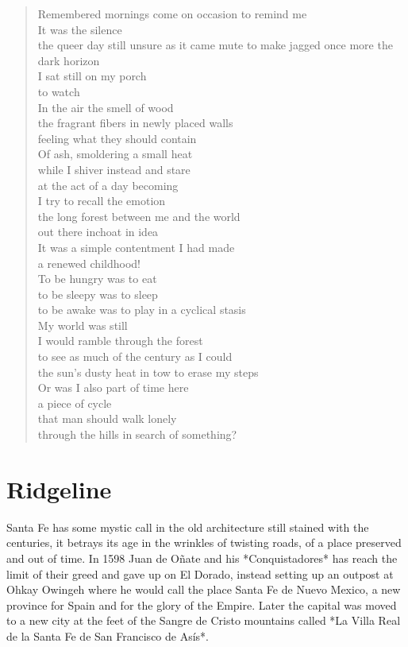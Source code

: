\documentclass[ebook, 10pt, openright, onecolumn]{memoir}
\newenvironment{poetry}
{
  \begin{quote}
    \begin{itshape}
      \small
    }
    {
    \end{itshape}
  \end{quote}
}
\begin{document}
\begin{poetry}
  Remembered mornings come on occasion to remind me\\
  It was the silence\\
  the queer day still unsure as it came mute to make jagged
  once more the dark horizon\\
  I sat still on my porch\\
  to watch\\
  In the air the smell of wood\\
  the fragrant fibers in newly placed walls\\
  feeling what they should contain\\
  Of ash, smoldering a small heat\\
  while I shiver instead and stare\\
  at the act of a day becoming\\

  I try to recall the emotion\\
  the long forest between me and the world\\
  out there inchoat in idea\\
  It was a simple contentment I had made\\
  a renewed childhood!\\
  To be hungry was to eat\\
  to be sleepy was to sleep\\
  to be awake was to play in a cyclical stasis\\
  My world was still\\
  I would ramble through the forest\\
  to see as much of the century as I could\\
  the sun's dusty heat in tow to erase my steps\\
  Or was I also part of time here\\
  a piece of cycle\\
  that man should walk lonely\\
  through the hills in search of something?
\end{poetry}

\chapter{Ridgeline}
\label{cha:ridgeline}


Santa Fe has some mystic call in the old architecture still stained with the
centuries, it betrays its age in the wrinkles of twisting roads, of a place
preserved and out of time.  In 1598 Juan de Oñate and his *Conquistadores* has
reach the limit of their greed and gave up on El Dorado, instead setting up an
outpost at Ohkay Owingeh where he would call the place Santa Fe de Nuevo
Mexico, a new province for Spain and for the glory of the Empire.  Later the
capital was moved to a new city at the feet of the Sangre de Cristo mountains
called *La Villa Real de la Santa Fe de San Francisco de Asís*.
\end{document}

